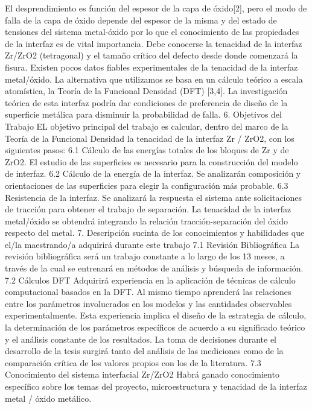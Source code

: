 El desprendimiento es función del espesor de la capa de óxido[2], pero el modo de falla de la capa de óxido depende del espesor de la misma y del estado de tensiones del sistema metal-óxido por lo que el conocimiento de las propiedades de la interfaz es de vital importancia. Debe conocerse la tenacidad de la interfaz Zr/ZrO2 (tetragonal) y el tamaño crítico del defecto desde donde comenzará la fisura. Existen pocos datos fiables experimentales de la tenacidad de la interfaz metal/óxido. La alternativa que utilizamos se basa en un cálculo teórico a escala atomística, la Teoría de la Funcional Densidad (DFT) [3,4]. La investigación teórica de esta interfaz podría dar condiciones de preferencia de diseño de la superficie metálica para disminuir la probabilidad de falla.
6. Objetivos del Trabajo
EL objetivo principal del trabajo es calcular, dentro del marco de la Teoría de la Funcional Densidad la tenacidad de la interfaz Zr / ZrO2, con los siguientes pasos:
6.1  Cálculo de las energías totales de los bloques de Zr y de ZrO2.
El estudio de las superficies es necesario para la construcción del modelo de interfaz.
6.2  Cálculo de la energía de la interfaz.
Se analizarán composición y orientaciones de las superficies para elegir la configuración más probable.
6.3  Resistencia de la interfaz.
 Se analizará la respuesta el sistema ante solicitaciones de tracción para obtener el trabajo de separación. La tenacidad de la interfaz metal/óxido se obtendrá integrando la relación tracción-separación del óxido respecto del metal.
7. Descripción sucinta de los conocimientos y habilidades que el/la maestrando/a adquirirá durante este trabajo
7.1  Revisión Bibliográfica
La revisión bibliográfica será un trabajo constante a lo largo de los 13 meses, a través de la cual se entrenará en métodos de análisis y búsqueda de información.
7.2  Cálculos DFT
Adquirirá experiencia en la aplicación de técnicas de cálculo computacional basados en la DFT. Al mismo tiempo aprenderá las relaciones entre los parámetros involucrados en los modelos y las cantidades observables experimentalmente.
Esta experiencia implica el diseño de la estrategia de cálculo, la determinación de los parámetros específicos de acuerdo a su significado teórico y el análisis constante de los resultados. La toma de decisiones durante el desarrollo de la tesis surgirá tanto del análisis de las mediciones como de la comparación crítica de los valores propios con los de la literatura.
7.3  Conocimiento del sistema interfacial Zr/ZrO2
Habrá ganado conocimiento específico sobre los temas del proyecto, microestructura y tenacidad de la interfaz metal / óxido metálico. 
